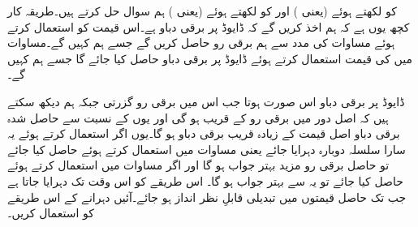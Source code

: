  کو  لکھتے ہوئے (یعنی ) اور
  کو   لکھتے ہوئے (یعنی ) ہم سوال حل کرتے ہیں۔طریقہ کار کچھ یوں ہے کہ ہم اخذ کریں گے کہ ڈایوڈ پر   برقی دباو ہے۔اس قیمت کو استعمال کرتے ہوئے مساوات   کی مدد سے ہم برقی رو حاصل کریں گے جسے ہم  کہیں گے۔مساوات   میں  کی قیمت استعمال کرتے ہوئے ڈایوڈ پر برقی دباو حاصل کیا جائے گا جسے ہم  کہیں گے۔

ڈایوڈ پر  برقی دباو اس صورت ہوتا جب اس میں  برقی رو گزرتی جبکہ ہم دیکھ سکتے ہیں کہ اصل دور میں برقی رو  کے قریب ہو گی اور یوں  کے نسبت سے حاصل شدہ برقی دباو  اصل قیمت کے زیادہ قریب برقی دباو ہو گا۔یوں اگر   استعمال کرتے ہوئے یہ سارا سلسلہ دوبارہ دہرایا جائے یعنی مساوات   میں   استعمال کرتے ہوئے  حاصل کیا جائے تو حاصل برقی رو مزید بہتر جواب ہو گا اور اگر مساوات   میں  استعمال کرتے ہوئے  حاصل کیا جائے تو یہ  سے بہتر جواب ہو گا۔ اس طریقے کو اس وقت تک  دہرایا جاتا ہے جب تک حاصل قیمتوں میں تبدیلی قابلِ نظر انداز ہو جائے۔آئیں دہرانے کے اس طریقے کو استعمال کریں۔
 
